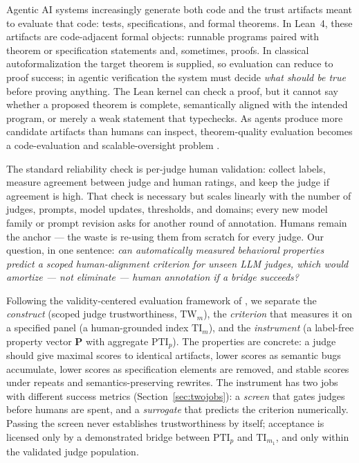 \documentclass{article}
\newcommand{\TW}{\mathrm{TW}}                    %
\newcommand{\TI}{\mathrm{TI}}                    %
\newcommand{\PTI}{\mathrm{PTI}}                  %
\newcommand{\TIm}[1]{\TI_{m_{#1}}}
\begin{document}
Agentic AI systems increasingly generate both code and the trust artifacts meant to evaluate that code: tests, specifications, and formal theorems.
In Lean~4, these artifacts are code-adjacent formal objects: runnable programs paired with theorem or specification statements and, sometimes, proofs.
In classical autoformalization the target theorem is supplied, so evaluation can reduce to proof success; in agentic verification the system must decide \emph{what should be true} before proving anything.
The Lean kernel can check a proof, but it cannot say whether a proposed theorem is complete, semantically aligned with the intended program, or merely a weak statement that typechecks.
As agents produce more candidate artifacts than humans can inspect, theorem-quality evaluation becomes a code-evaluation and scalable-oversight problem \citep{bowman2022scalable,zhou2025graders,khattab2024dspy,cheng2024trace}.

The standard reliability check is per-judge human validation: collect labels, measure agreement between judge and human ratings, and keep the judge if agreement is high.
That check is necessary but scales linearly with the number of judges, prompts, model updates, thresholds, and domains; every new model family or prompt revision asks for another round of annotation.
Humans remain the anchor --- the waste is re-using them from scratch for every judge.
Our question, in one sentence: \emph{can automatically measured behavioral properties predict a scoped human-alignment criterion for unseen LLM judges, which would amortize --- not eliminate --- human annotation if a bridge succeeds?}

Following the validity-centered evaluation framework of \citet{salaudeen2025measurement}, we separate the \emph{construct} (scoped judge trustworthiness, $\TW_m$), the \emph{criterion} that measures it on a specified panel (a human-grounded index $\TI_m$), and the \emph{instrument} (a label-free property vector $\mathbf{P}$ with aggregate $\PTI_p$).
The properties are concrete: a judge should give maximal scores to identical artifacts, lower scores as semantic bugs accumulate, lower scores as specification elements are removed, and stable scores under repeats and semantics-preserving rewrites.
The instrument has two jobs with different success metrics (Section~\ref{sec:twojobs}): a \emph{screen} that gates judges before humans are spent, and a \emph{surrogate} that predicts the criterion numerically.
Passing the screen never establishes trustworthiness by itself; acceptance is licensed only by a demonstrated bridge between $\PTI_p$ and $\TIm{1}$, and only within the validated judge population.
\end{document}

